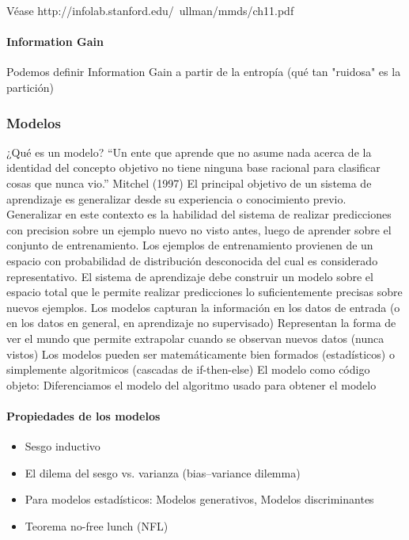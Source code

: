 \documentclass[a4paper,10pt]{article}
\begin{document}
Véase http://infolab.stanford.edu/~ullman/mmds/ch11.pdf


\paragraph{Information Gain}
Podemos definir Information Gain a partir de la entropía (qué tan "ruidosa" es la partición)

\subsubsection{Modelos}

¿Qué es un modelo?
“Un ente que aprende que no asume nada acerca de la identidad del concepto objetivo no tiene ninguna base racional para clasificar cosas que nunca vio.”
Mitchel (1997)
El principal objetivo de un sistema de aprendizaje es generalizar desde su experiencia o conocimiento previo. Generalizar en este contexto es la habilidad del sistema de realizar
predicciones con precision sobre un ejemplo nuevo no visto antes, luego de aprender sobre el conjunto de entrenamiento. Los ejemplos de entrenamiento provienen de un espacio 
con probabilidad de distribución desconocida del cual es considerado representativo. El sistema de aprendizaje debe construir un modelo sobre el espacio total que le permite realizar
predicciones lo suficientemente precisas sobre nuevos ejemplos.
Los modelos capturan la información en los datos de entrada (o en los datos en general, en aprendizaje no supervisado)
Representan la forma de ver el mundo que permite extrapolar cuando se observan nuevos datos (nunca vistos)
Los modelos pueden ser matemáticamente bien formados (estadísticos) o simplemente algoritmicos (cascadas de if-then-else)
El modelo como código objeto: Diferenciamos el modelo del algoritmo usado para obtener el modelo

\paragraph{Propiedades de los modelos}
\begin{itemize}
 \item Sesgo inductivo
\item El dilema del sesgo vs. varianza (bias–variance dilemma)
\item Para modelos estadísticos: Modelos generativos, Modelos discriminantes
\item Teorema no-free lunch (NFL)
\end{itemize}
\end{document}
